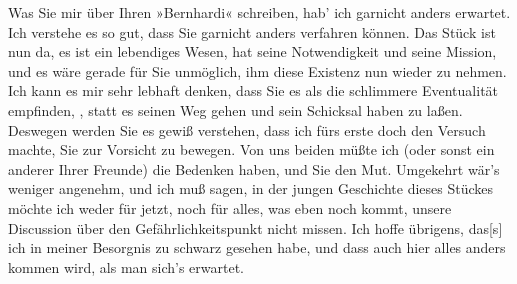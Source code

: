 \pstart
           Was Sie mir über Ihren »Bernhardi« schreiben,
               hab’ ich garnicht anders erwartet. Ich verstehe es so gut, dass Sie garnicht anders
               verfahren können. Das Stück
               ist nun da, es ist ein lebendiges Wesen, hat seine Notwendigkeit und seine Mission,
               und es wäre gerade für Sie unmöglich, ihm diese Existenz nun wieder zu nehmen. Ich
               kann es mir sehr lebhaft denken, dass Sie es als die schlimmere Eventualität
               empfinden, \label{K_L03558-2v}\label{K_L03558-2}, statt es seinen
               Weg gehen und sein Schicksal haben zu laßen. Deswegen werden Sie es gewiß verstehen,
               dass ich fürs erste doch den Versuch machte, Sie zur Vorsicht zu bewegen. Von uns
               beiden müßte ich (oder sonst ein anderer Ihrer Freunde) die Bedenken haben, und Sie
               den Mut. Umgekehrt wär’s weniger angenehm, und ich muß sagen, in der jungen
               Geschichte dieses Stückes
               möchte ich weder für jetzt, noch für alles, was eben noch kommt, unsere Discussion
               über den Gefährlichkeitspunkt nicht missen. Ich hoffe übrigens,
                  das{[}s{]} ich in meiner Besorgnis zu schwarz gesehen habe, und
               dass auch hier alles anders kommen wird, als man sich’s erwartet.\pend
           
